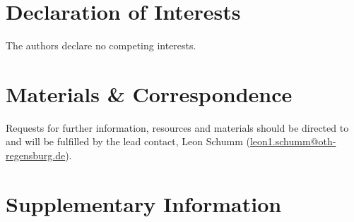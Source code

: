 \documentclass[5p,numafflabel]{elsarticle}
\begin{document}
\section*{Declaration of Interests}

The authors declare no competing interests.


\section*{Materials \& Correspondence}

Requests for further information, resources and materials should be directed to and will be fulfilled by the lead contact, Leon Schumm
(\href{mailto:leon1.schumm@oth-regensburg.de}{leon1.schumm@oth-regensburg.de}).




\newpage
\onecolumn

\makeatletter
\renewcommand \thesection{S\@arabic\c@section}
\renewcommand\thetable{S\@arabic\c@table}
\renewcommand \thefigure{S\@arabic\c@figure}
\makeatother
\renewcommand{\citenumfont}[1]{S#1}
\setcounter{equation}{0}
\setcounter{figure}{0}
\setcounter{table}{0}
\setcounter{section}{0}


\section*{Supplementary Information}
\label{sec:si}
















\renewcommand{\ttdefault}{\sfdefault}

\end{document}
